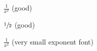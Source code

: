 \documentclass{article}
\begin{document}
$\frac{1}{x^2}$ (good)

$\sfrac{1}{2}$  (good)

$\frac{1}{x^2}$ (very small exponent font)
\end{document}
